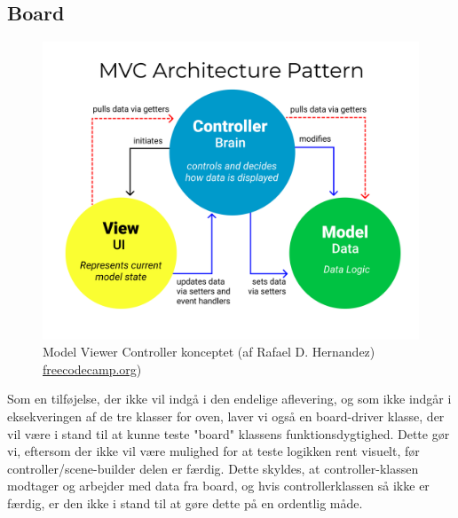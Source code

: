 \subsection{Board}
\begin{figure}[H]
    \centering
    \caption{Model Viewer Controller konceptet (af Rafael D. Hernandez) \href{https://www.freecodecamp.org/news/the-model-view-controller-pattern-mvc-architecture-and-frameworks-explained/}{freecodecamp.org})}\label{fig:my_label}
    \includegraphics[width=.5\textwidth]{Graphics/MVC3.png}
\end{figure}
Som en tilføjelse, der ikke vil indgå i den endelige aflevering, og som ikke indgår i eksekveringen af de tre klasser for oven, laver vi også en board-driver klasse, der vil være i stand til at kunne teste "board" klassens funktionsdygtighed. Dette gør vi, eftersom der ikke vil være mulighed for at teste logikken rent visuelt, før controller/scene-builder delen er færdig. Dette skyldes, at controller-klassen modtager og arbejder med data fra board, og hvis controllerklassen så ikke er færdig, er den ikke i stand til at gøre dette på en ordentlig måde. 